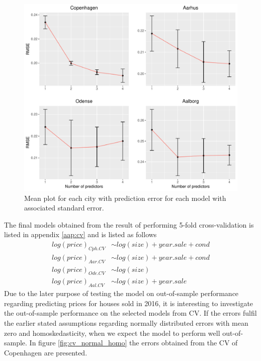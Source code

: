 \begin{figure}[H]
    \centering
  \includegraphics[width = 1 \textwidth]{figures/Nanna/CrossValidationSamlet.pdf}
  \caption{Mean plot for each city with prediction error for each model with associated standard error.}
  \label{fig:CrossValidationSamlet}
\end{figure}

The final models obtained from the result of performing 5-fold cross-validation is listed in appendix \ref{aap:cv} and is listed as follows
\begin{align*}
    log(price)_{Cph.CV} &\sim log(size) + year.sale + cond \\
    log(price)_{Aar.CV} &\sim log(size) + year.sale + cond\\
    log(price)_{Ode.CV} &\sim log(size) \\
    log(price)_{Aal.CV} &\sim log(size) + year.sale 
\end{align*}
Due to the later purpose of testing the model on out-of-sample performance regarding predicting prices for houses sold in 2016, it is interesting to investigate the out-of-sample performance on the selected models from CV.
If the errors fulfil the earlier stated assumptions regarding normally distributed errors with mean zero and homoskedasticity, when we expect the model to perform well out-of-sample. In figure \ref{fig:cv_normal_homo} the errors obtained from the CV of Copenhagen are presented.

